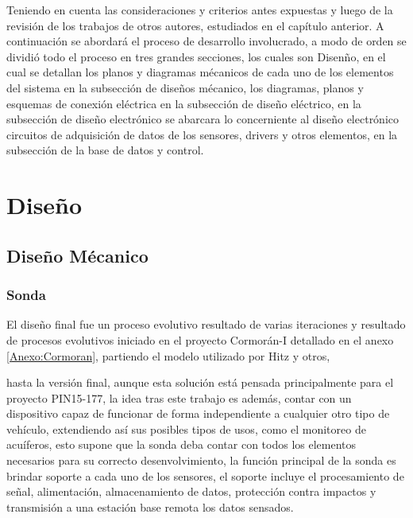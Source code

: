 Teniendo en cuenta las consideraciones y criterios antes expuestas y luego de la revisi\'on de los trabajos de otros autores, estudiados en el cap\'itulo anterior. A continuaci\'on se abordar\'a el proceso de desarrollo involucrado, a modo de orden se dividi\'o todo el proceso en tres grandes secciones, los cuales son Disen\~no, en el cual se detallan los planos y diagramas m\'ecanicos de cada uno de los elementos del sistema en la subsecci\'on de dise\~nos m\'ecanico, los diagramas, planos y esquemas de conexi\'on el\'ectrica en la subsecci\'on de dise\~no el\'ectrico, en la subsecci\'on de dise\~no electr\'onico se abarcara lo concerniente al diseño electr\'onico circuitos de adquisici\'on de datos de los sensores, drivers y otros elementos, en la subsecci\'on de la base de datos y control. 

\section{Dise\~no}

\subsection[Dise\~no M\'ecanico]{Dise\~no M\'ecanico}
\subsubsection[Sonda]{Sonda}

El dise\~no final fue un proceso evolutivo resultado de varias iteraciones y resultado de procesos evolutivos iniciado en el proyecto Cormor\'an-I detallado en el anexo \ref{Anexo:Cormoran},  partiendo el modelo utilizado por Hitz y otros\cite{hitz2012design}, %

hasta la versi\'on final, aunque esta soluci\'on est\'a pensada principalmente para el proyecto PIN15-177, la idea tras este trabajo es adem\'as, contar con un dispositivo capaz de funcionar de forma independiente a cualquier otro tipo de veh\'iculo, extendiendo as\'i sus posibles tipos de usos, como el monitoreo de acu\'iferos, esto supone que la sonda deba contar con todos los elementos necesarios para su correcto desenvolvimiento, la funci\'on principal de la sonda es brindar soporte a cada uno de los sensores, el soporte incluye el procesamiento de se\~nal, alimentaci\'on, almacenamiento de datos, protecci\'on contra impactos y transmisi\'on a una estaci\'on base remota los datos sensados.

